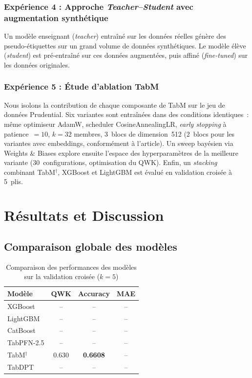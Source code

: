 \documentclass[conference]{IEEEtran}
\begin{document}
\subsubsection{Expérience 4 : Approche \textit{Teacher--Student} avec augmentation synthétique}
Un modèle enseignant (\textit{teacher}) entraîné sur les données réelles génère des
pseudo-étiquettes sur un grand volume de données synthétiques. Le modèle élève (\textit{student})
est pré-entraîné sur ces données augmentées, puis affiné (\textit{fine-tuned}) sur les données
originales.

\subsubsection{Expérience 5 : Étude d'ablation TabM}
Nous isolons la contribution de chaque composante de TabM sur le jeu de données Prudential.
Six variantes sont entraînées dans des conditions identiques~: même optimiseur AdamW,
scheduler CosineAnnealingLR, \textit{early stopping} à patience~$=10$, $k=32$ membres,
3~blocs de dimension~512 (2~blocs pour les variantes avec embeddings, conformément à
l'article). Un sweep bayésien via Weights \& Biases explore ensuite l'espace des
hyperparamètres de la meilleure variante (30~configurations, optimisation du QWK).
Enfin, un \textit{stacking} combinant TabM$^\dagger$, XGBoost et LightGBM est évalué
en validation croisée à 5~plis.

\section{Résultats et Discussion}
\label{sec:resultats}

\subsection{Comparaison globale des modèles}

\begin{table}[htbp]
\caption{Comparaison des performances des modèles sur la validation croisée ($k=5$)}
\label{tab:resultats_globaux}
\centering
\begin{tabular}{lccc}
\toprule
\textbf{Modèle} & \textbf{QWK} & \textbf{Accuracy} & \textbf{MAE} \\
\midrule
XGBoost          & -- & -- & -- \\
LightGBM         & -- & -- & -- \\
CatBoost         & -- & -- & -- \\
TabPFN-2.5       & -- & -- & -- \\
TabM$^\dagger$   & 0.630 & \textbf{0.6608} & -- \\
TabDPT           & -- & -- & -- \\
\bottomrule
\end{tabular}
\end{table}
\end{document}
